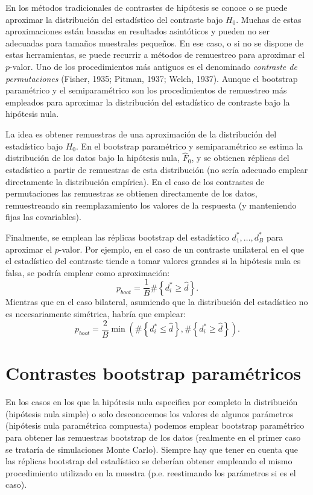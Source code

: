 \documentclass[
]{book}
\theoremstyle{break}
\theoremstyle{definition}
\theoremstyle{definition}
\theoremstyle{definition}
\theoremstyle{definition}
\theoremstyle{remark}
\begin{document}
En los métodos tradicionales de contrastes de hipótesis se conoce o se
puede aproximar la distribución del estadístico del contraste bajo \(H_0\).
Muchas de estas aproximaciones están basadas en resultados asintóticos
y pueden no ser adecuadas para tamaños muestrales pequeños.
En ese caso, o si no se dispone de estas herramientas,
se puede recurrir a métodos de remuestreo para aproximar el \(p\)-valor.
Uno de los procedimientos más antiguos es el denominado
\emph{contraste de permutaciones} (Fisher, 1935; Pitman, 1937; Welch, 1937).
Aunque el bootstrap paramétrico y el semiparamétrico son los
procedimientos de remuestreo más empleados para aproximar
la distribución del estadístico de contraste bajo la hipótesis nula.

La idea es obtener remuestras de una aproximación de la distribución del
estadístico bajo \(H_0\).
En el bootstrap paramétrico y semiparamétrico se estima la distribución
de los datos bajo la hipótesis nula, \(\hat{F}_0\), y se obtienen réplicas del
estadístico a partir de remuestras de esta distribución (no sería adecuado
emplear directamente la distribución empírica).
En el caso de los contrastes de permutaciones las remuestras se obtienen
directamente de los datos, remuestreando sin reemplazamiento los valores
de la respuesta (y manteniendo fijas las covariables).

Finalmente, se emplean las réplicas bootstrap
del estadístico \(d_1^{\ast},\ldots, d_B^{\ast}\) para aproximar el \(p\)-valor.
Por ejemplo, en el caso de un contraste unilateral en el que el estadístico del
contraste tiende a tomar valores grandes si la hipótesis nula es falsa,
se podría emplear como aproximación:
\[p_{boot} = \frac{1}{B}\#\left\{ d_i^{\ast} \geq \hat{d} \right\}.\]
Mientras que en el caso bilateral, asumiendo que la distribución del estadístico
no es necesariamente simétrica, habría que emplear:
\[p_{boot} = \frac{2}{B} \min \left(\#\left\{ d_i^{\ast} \leq \hat{d} \right\},
\#\left\{ d_i^{\ast} \geq \hat{d} \right\}\right).\]

\hypertarget{contrastes-parametricos}{%
\section{Contrastes bootstrap paramétricos}\label{contrastes-parametricos}}

En los casos en los que la hipótesis nula especifica por completo la distribución
(hipótesis nula simple) o solo desconocemos los valores de algunos parámetros
(hipótesis nula paramétrica compuesta) podemos emplear
bootstrap paramétrico para obtener las remuestras bootstrap de los datos
(realmente en el primer caso se trataría de simulaciones Monte Carlo).
Siempre hay que tener en cuenta que las réplicas bootstrap del estadístico se
deberían obtener empleando el mismo procedimiento utilizado en la muestra
(p.e. reestimando los parámetros si es el caso).
\end{document}
